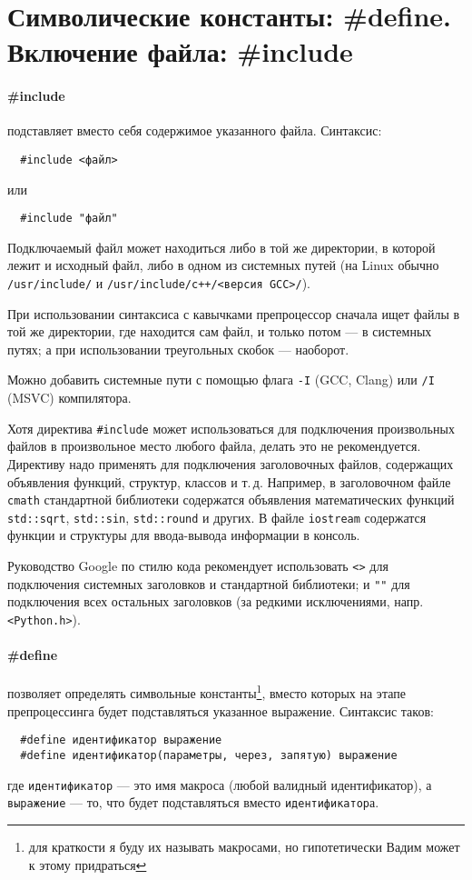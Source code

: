 \documentclass[14pt, a4paper]{extarticle}
\begin{document}
\section{Символические константы: \#define. Включение файла: \#include}
\paragraph{\#include} подставляет вместо себя содержимое указанного файла. Синтаксис:
\begin{verbatim}
  #include <файл>
\end{verbatim}
или
\begin{verbatim}
  #include "файл"
\end{verbatim}
Подключаемый файл может находиться либо в той же директории, в которой лежит и исходный файл,
либо в одном из системных путей (на Linux обычно \verb|/usr/include/| и \verb|/usr/include/c++/<версия GCC>/|).

При использовании синтаксиса с кавычками препроцессор сначала ищет файлы в той же директории,
где находится сам файл, и только потом --- в системных путях; а при использовании треугольных скобок --- наоборот.

{\small Можно добавить системные пути с помощью флага \verb|-I| (GCC, Clang) или \verb|/I| (MSVC) компилятора. }

Хотя директива \verb|#include| может использоваться для подключения произвольных файлов в произвольное место
любого файла, делать это не рекомендуется. Директиву надо применять для подключения заголовочных файлов, содержащих
объявления функций, структур, классов и т.\,д. Например, в заголовочном файле \verb|cmath|
стандартной библиотеки содержатся объявления математических функций \verb|std::sqrt|, \verb|std::sin|,
\verb|std::round| и других. В файле \verb|iostream| содержатся функции и структуры для ввода-вывода информации
в консоль.

Руководство Google по стилю кода рекомендует использовать \verb|<>| для подключения системных заголовков
и стандартной библиотеки; и \verb|""| для подключения всех остальных заголовков (за редкими исключениями, напр. \verb|<Python.h>|).

\paragraph{\#define} позволяет определять символьные константы\footnote{для краткости я буду их называть макросами,
но гипотетически Вадим может к этому придраться}, вместо которых на этапе препроцессинга
будет подставляться указанное выражение.
Синтаксис таков:
\begin{verbatim}
  #define идентификатор выражение
  #define идентификатор(параметры, через, запятую) выражение
\end{verbatim}
где \verb|идентификатор| --- это имя макроса (любой валидный идентификатор),
а \verb|выражение| --- то, что будет подставляться вместо \verb|идентификатор|а.
\end{document}
